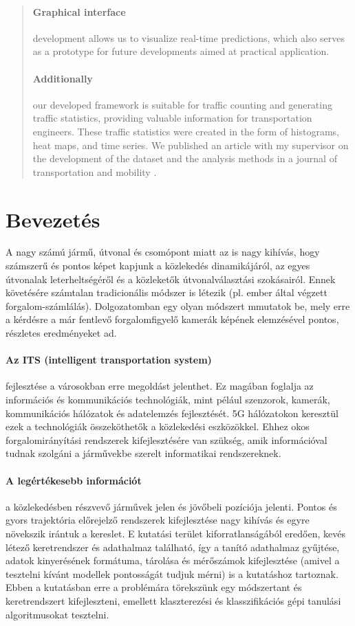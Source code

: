 \documentclass[12pt,a4paper]{article}
\begin{document}
\begin{abstract}
    \paragraph{Graphical interface} development allows us to visualize real-time predictions, which also serves as a prototype for future developments aimed at practical application.
    \paragraph{Additionally} our developed framework is suitable for traffic counting and generating traffic statistics, providing valuable information for transportation engineers.
    These traffic statistics were created in the form of histograms, heat maps, and time series.
    We published an article with my supervisor on the development of the dataset and the analysis methods in a journal of transportation and mobility \cite{aggpeterhorvath2023}.

\end{abstract}

\newpage

\section{Bevezetés}
A nagy számú jármű, útvonal és csomópont miatt az is nagy kihívás, hogy számszerű és pontos képet kapjunk
a közlekedés dinamikájáról, az egyes útvonalak leterheltségéről és a közleketők útvonalválasztási szokásairól.
Ennek követésére számtalan tradicionális módszer is létezik (pl. ember által végzett forgalom-számlálás).
Dolgozatomban egy olyan módszert mmutatok be, mely erre a kérdésre a már fentlevő forgalomfigyelő
kamerák képének elemzésével pontos, részletes eredményeket ad.
\paragraph{Az ITS (intelligent transportation system)} fejlesztése a városokban erre megoldást jelenthet. Ez magában foglalja az információs és
kommunikációs technológiák, mint pélául szenzorok, kamerák, kommunikációs hálózatok és adatelemzés fejlesztését. 5G hálózatokon
keresztül ezek a technológiák összeköthetők a közlekedési eszközökkel. Ehhez okos forgalomirányítási rendszerek kifejlesztésére
van szükség, amik információval tudnak szolgáni a járművekbe szerelt informatikai rendszereknek.
\paragraph{A legértékesebb információt} a közlekedésben részvevő járművek jelen és jövőbeli pozíciója jelenti. Pontos és gyors trajektória
előrejelző rendszerek kifejlesztése nagy kihívás és egyre növekszik irántuk a kereslet. E kutatási terület kiforratlanságából
eredően, kevés létező keretrendszer és adathalmaz található, így a tanító adathalmaz gyűjtése, adatok kinyerésének formátuma, tárolása
és mérőszámok kifejlesztése (amivel a tesztelni kívánt modellek pontosságát tudjuk mérni) is a kutatáshoz tartoznak.
Ebben a kutatásban erre a problémára törekszünk egy módszertant és keretrendszert kifejleszteni, emellett klaszterezési és klasszifikációs
gépi tanulási algoritmusokat tesztelni.
\end{document}
